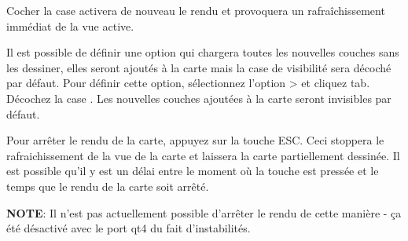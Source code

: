 Cocher la case  activera de nouveau le rendu et provoquera un rafra\^ichissement imm\'ediat de la vue active.

%

\label{label_settinglayer}

Il est possible de d\'efinir une option qui chargera toutes les nouvelles couches sans les dessiner, elles seront ajout\'es \`a la carte mais la case de visibilit\'e sera d\'ecoch\'e par d\'efaut. Pour d\'efinir cette option, s\'electionnez l'option  >  et cliquez  tab. D\'ecochez la case . Les nouvelles couches ajout\'ees \`a la carte seront invisibles par d\'efaut.


\label{label_stoprender}

Pour arr\^eter le rendu de la carte, appuyez sur la touche ESC. Ceci stoppera le rafraichissement de la vue de la carte et laissera la carte partiellement dessin\'ee. Il est possible qu'il y est un d\'elai entre le moment o\`u la touche est press\'ee et le temps que le rendu de la carte soit arr\^et\'e.

\textbf{NOTE}: Il n'est pas actuellement possible d'arr\^eter le rendu de cette mani\`ere - \c{c}a \'et\'e d\'esactiv\'e avec le port qt4 du fait d'instabilit\'es.

